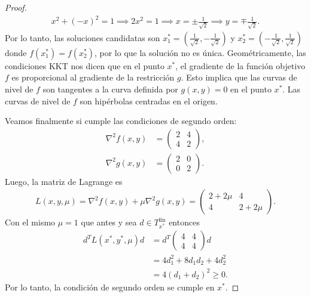 \documentclass{article}
\begin{document}
\begin{proof}
\begin{align*}
        x^2 + (-x)^2 = 1 \implies 2x^2 = 1 \implies x = \pm \frac{1}{\sqrt{2}} \implies y = \mp \frac{1}{\sqrt{2}}.
    \end{align*}
    Por lo tanto, las soluciones candidatas son \( x_1^* = \left( \frac{1}{\sqrt{2}}, -\frac{1}{\sqrt{2}} \right) \) y \( x_2^* = \left( -\frac{1}{\sqrt{2}}, \frac{1}{\sqrt{2}} \right) \) donde \( f(x_1^*) = f(x_2^*) \), por lo que la solución no es única.
    Geométricamente, las condiciones KKT nos dicen que en el punto \( x^* \), el gradiente de la función objetivo \( f \) es proporcional al gradiente de la restricción \( g \).
    Esto implica que las curvas de nivel de \( f \) son tangentes a la curva definida por \( g(x, y) = 0 \) en el punto \( x^* \).
    Las curvas de nivel de \( f \) son hipérbolas centradas en el origen.

    Veamos finalmente si cumple las condiciones de segundo orden: \begin{align*}
        \nabla^2 f(x, y) & = \begin{pmatrix}
                                 2 & 4 \\
                                 4 & 2
                             \end{pmatrix}, \\
        \nabla^2 g(x, y) & = \begin{pmatrix}
                                 2 & 0 \\
                                 0 & 2
                             \end{pmatrix}.
    \end{align*}
    Luego, la matriz de Lagrange es \begin{align*}
        L(x, y, \mu) = \nabla^2 f(x, y) + \mu \nabla^2 g(x, y) = \begin{pmatrix}
                                                                     2 + 2\mu & 4        \\
                                                                     4        & 2 + 2\mu
                                                                 \end{pmatrix}.
    \end{align*}
    Con el mismo \( \mu = 1 \) que antes y sea \( d \in T^\text{lin}_{x^*} \) entonces \begin{align*}
        d^T L(x^*, y^*, \mu) d & = d^T \begin{pmatrix}
                                                4 & 4 \\
                                                4 & 4
                                            \end{pmatrix} d \\
                             & = 4 d_1^2 + 8 d_1 d_2 + 4 d_2^2 \\
                             & = 4 {(d_1 + d_2)}^2 \geq 0.
    \end{align*}
    Por lo tanto, la condición de segundo orden se cumple en \( x^* \).
\end{proof}
\end{document}
